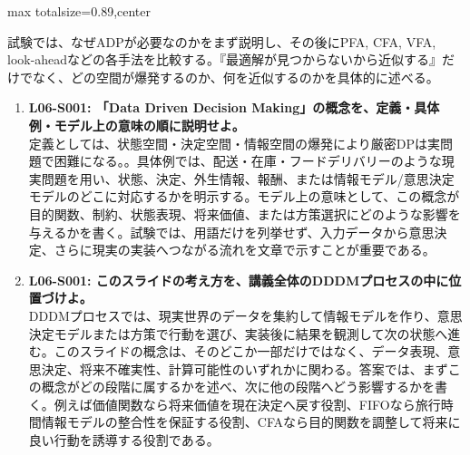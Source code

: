 \begin{minipage}[t]{0.58\textwidth}
\begin{adjustbox}{max totalsize={\textwidth}{0.89\textheight},center}
\begin{minipage}{\textwidth}
試験では、なぜADPが必要なのかをまず説明し、その後にPFA, CFA, VFA, look-aheadなどの各手法を比較する。『最適解が見つからないから近似する』だけでなく、どの空間が爆発するのか、何を近似するのかを具体的に述べる。\par{}\begin{enumerate}\item \textbf{L06-S001: 「Data Driven Decision Making」の概念を、定義・具体例・モデル上の意味の順に説明せよ。}\\定義としては、状態空間・決定空間・情報空間の爆発により厳密DPは実問題で困難になる。。具体例では、配送・在庫・フードデリバリーのような現実問題を用い、状態、決定、外生情報、報酬、または情報モデル/意思決定モデルのどこに対応するかを明示する。モデル上の意味として、この概念が目的関数、制約、状態表現、将来価値、または方策選択にどのような影響を与えるかを書く。試験では、用語だけを列挙せず、入力データから意思決定、さらに現実の実装へつながる流れを文章で示すことが重要である。\item \textbf{L06-S001: このスライドの考え方を、講義全体のDDDMプロセスの中に位置づけよ。}\\DDDMプロセスでは、現実世界のデータを集約して情報モデルを作り、意思決定モデルまたは方策で行動を選び、実装後に結果を観測して次の状態へ進む。このスライドの概念は、そのどこか一部だけではなく、データ表現、意思決定、将来不確実性、計算可能性のいずれかに関わる。答案では、まずこの概念がどの段階に属するかを述べ、次に他の段階へどう影響するかを書く。例えば価値関数なら将来価値を現在決定へ戻す役割、FIFOなら旅行時間情報モデルの整合性を保証する役割、CFAなら目的関数を調整して将来に良い行動を誘導する役割である。\end{enumerate}
\end{minipage}
\end{adjustbox}
\end{minipage}


